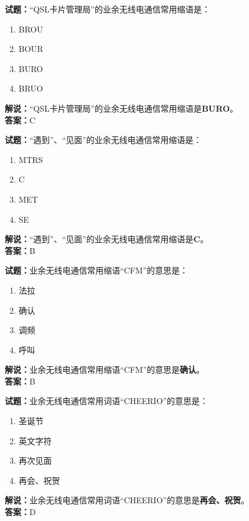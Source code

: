 \documentclass{ctexbook}
\begin{document}
\vspace{1em}

\textbf{试题：}“QSL卡片管理局”的业余无线电通信常用缩语是：
\begin{enumerate}[leftmargin=3em]
  \item BROU
  \item BOUR
  \item BURO
  \item BRUO
\end{enumerate}
\noindent\textbf{解说：}“QSL卡片管理局”的业余无线电通信常用缩语是\textbf{BURO}。\\\noindent\textbf{答案：}C

\vspace{1em}

\textbf{试题：}“遇到”、“见面”的业余无线电通信常用缩语是：
\begin{enumerate}[leftmargin=3em]
  \item MTRS
  \item C
  \item MET
  \item SE
\end{enumerate}
\noindent\textbf{解说：}“遇到”、“见面”的业余无线电通信常用缩语是\textbf{C}。\\\noindent\textbf{答案：}B

\vspace{1em}

\textbf{试题：}业余无线电通信常用缩语“CFM”的意思是：
\begin{enumerate}[leftmargin=3em]
  \item 法拉
  \item 确认
  \item 调频
  \item 呼叫
\end{enumerate}
\noindent\textbf{解说：}业余无线电通信常用缩语“CFM”的意思是\textbf{确认}。\\\noindent\textbf{答案：}B

\vspace{1em}

\textbf{试题：}业余无线电通信常用词语“CHEERIO”的意思是：
\begin{enumerate}[leftmargin=3em]
  \item 圣诞节
  \item 英文字符
  \item 再次见面
  \item 再会、祝贺
\end{enumerate}
\noindent\textbf{解说：}业余无线电通信常用词语“CHEERIO”的意思是\textbf{再会、祝贺}。\\\noindent\textbf{答案：}D
\end{document}
